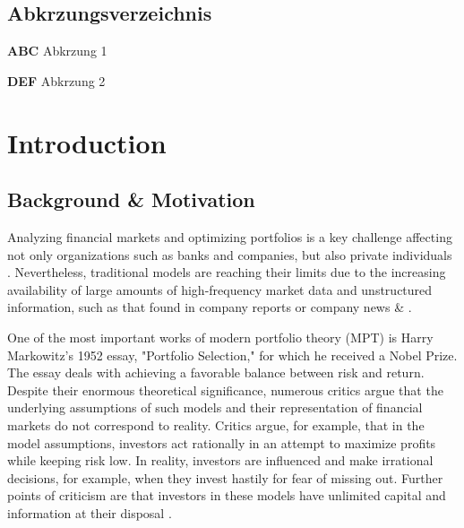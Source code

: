 \documentclass{agasthesis}
\begin{document}
\renewcommand{\contentsname}{Table of Contents}
\tableofcontents

\section*{Abkrzungsverzeichnis}

\begin{description}
	\item \textbf{ABC} Abkrzung 1%
	\item \textbf{DEF} Abkrzung 2%
\end{description}



\newpage

\newpage

\chapter{Introduction}
\section{Background & Motivation}
Analyzing financial markets and optimizing portfolios is a key challenge affecting not only organizations such as banks and companies, 
but also private individuals \cite{salo_fifty_2024}. Nevertheless, 
traditional models are reaching their limits due to the increasing availability of large amounts of high-frequency market data and unstructured information, 
such as that found in company reports or company news \cite{zhang_novel_2023} & \cite{guo_textual_2016}.

One of the most important works of modern portfolio theory (MPT) is Harry Markowitz's 1952 essay, 
"Portfolio Selection," for which he received a Nobel Prize. The essay deals with achieving a favorable balance between risk and return. 
Despite their enormous theoretical significance, numerous critics argue that the underlying assumptions of such models and their representation of financial markets 
do not correspond to reality. Critics argue, for example, that in the model assumptions, investors act rationally in an attempt to maximize profits while keeping risk low. 
In reality, investors are influenced and make irrational decisions, for example, when they invest hastily for fear of missing out. Further points of criticism are that investors 
in these models have unlimited capital and information at their disposal \cite{mangram_simplified_2013}.
\end{document}
